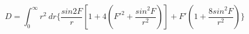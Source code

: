 \begin{equation}
D= \int_0^\infty r^2 ~dr \{\frac{sin2F}{r} [1+4(F'^2 +\frac{sin^2F}{r^2})]+F'(1+\frac{8 sin^2F}{r^2})\}
\end{equation}

